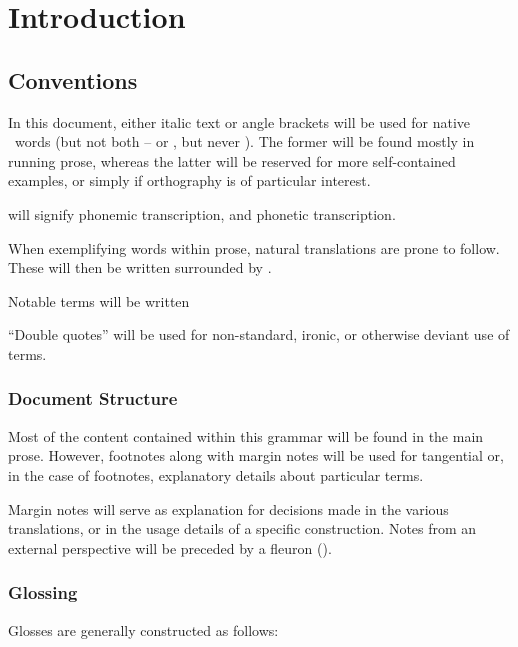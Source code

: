 \chapter{Introduction}\label{ch:introduction}
\section{Conventions}\label{sec:conventions}
In this document, either italic text or angle brackets will be used for native \langname\ words (but not both --  or , but never ).
The former will be found mostly in running prose, whereas the latter will be reserved for more self-contained examples, or simply if orthography is of particular interest.

 will signify phonemic transcription, and  phonetic transcription.

When exemplifying words within prose, natural translations are prone to follow. These will then be written surrounded by .

Notable terms will be written 

``Double quotes'' will be used for non-standard, ironic, or otherwise deviant use of terms.

\subsection{Document Structure}
Most of the content contained within this grammar will be found in the main prose. However, footnotes along with margin notes will be used for tangential or, in the case of footnotes, explanatory details about particular terms.
%
%

Margin notes will serve as explanation for decisions made in the various translations, or in the usage details of a specific construction.
Notes from an external perspective will be preceded by a fleuron (\fleuron).

\subsection{Glossing}\label{sec:conventions-gloss}
Glosses are generally constructed as follows:

